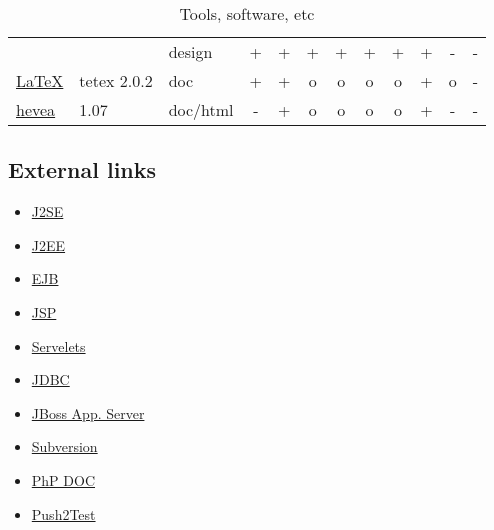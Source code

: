 \begin{table}[htbp]
\begin{tabular}[t]{|lll|cc|ccccccc|}
    &
    & 
    design %
    & 
    +  %
    & 
    +  %
    &
    + %
    &
    + %
    &
    + %
    &
    + %
    & 
    + %
    &
    - %
    &
    - %
    \\
    \href{http://www.latex-project.org/}{\LaTeX}
    &
    tetex 2.0.2 %
    & 
    doc %
    & 
    +  %
    & 
    + %
    &
    o %
    &
    o %
    &
    o %
    &
    o %
    & 
    + %
    &
    o %
    &
    - %
    \\
    \href{http://pauillac.inria.fr/~maranget/hevea}{hevea}
    &
    1.07 %
    & 
    doc/html 
    & 
    - %
    & 
    + %
    &
    o %
    &
    o %
    &
    o %
    &
    o %
    & 
    + %
    &
    - %
    &
    - %
    \\\hline
  \end{tabular}
  \caption{Tools, software, etc}
  \label{tab:tools}
\end{table}

\subsection*{External links}

\begin{itemize}
\item \href{http://java.sun.com/j2se/index.jsp}{J2SE}
\item \href{http://java.sun.com/j2ee/index.jsp}{J2EE}
\item \href{http://java.sun.com/products/ejb/}{EJB}
\item \href{http://java.sun.com/products/jsp/index.jsp}{JSP}
\item \href{http://java.sun.com/products/servlet/index.jsp}{Servelets}
\item \href{http://www.mysql.com/products/connector/j/}{JDBC}
\item \href{http://www.jboss.org/}{JBoss App. Server}
\item \href{http://subversion.tigris.org/}{Subversion}
\item \href{http://www.phpdoc.org/docs/HTMLSmartyConverter/default/phpDocumentor/tutorial_tags.pkg.html}{PhP DOC}
\item \href{http://www.pushtotest.com/}{Push2Test}
\end{itemize}




